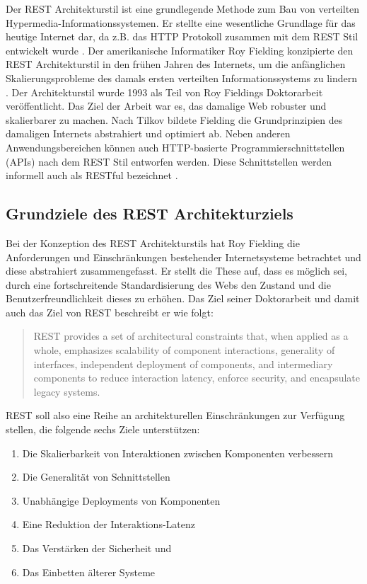 Der REST Architekturstil ist eine grundlegende Methode zum Bau von verteilten Hypermedia-Informationssystemen. Er stellte eine wesentliche Grundlage für das heutige Internet dar, da z.B. das HTTP Protokoll zusammen mit dem REST Stil entwickelt wurde . Der amerikanische Informatiker Roy Fielding konzipierte den REST Architekturstil in den frühen Jahren des Internets, um die anfänglichen Skalierungsprobleme des damals ersten verteilten Informationssystems zu lindern . Der Architekturstil wurde 1993 als Teil von Roy Fieldings Doktorarbeit veröffentlicht. Das Ziel der Arbeit war es, das damalige Web robuster und skalierbarer zu machen. Nach Tilkov bildete Fielding die Grundprinzipien des damaligen Internets abstrahiert und optimiert ab. Neben anderen Anwendungsbereichen können auch HTTP-basierte Programmierschnittstellen (APIs) nach dem REST Stil entworfen werden. Diese Schnittstellen werden informell auch als RESTful bezeichnet . 

\subsection{Grundziele des REST Architekturziels}

Bei der Konzeption des REST Architekturstils hat Roy Fielding die Anforderungen und Einschränkungen bestehender Internetsysteme betrachtet und diese abstrahiert zusammengefasst. Er stellt die These auf, dass es möglich sei, durch eine fortschreitende Standardisierung des Webs den Zustand und die Benutzerfreundlichkeit dieses zu erhöhen. Das Ziel seiner Doktorarbeit und damit auch das Ziel von REST beschreibt er wie folgt:

\begin{quote}
    REST provides a set of architectural constraints that, when applied as a whole, emphasizes scalability of component interactions, generality of interfaces, independent deployment of components, and intermediary components to reduce interaction latency, enforce security, and encapsulate legacy systems.
\end{quote}

REST soll also eine Reihe an architekturellen Einschränkungen zur Verfügung stellen, die folgende sechs Ziele unterstützen:

\begin{enumerate}
    \item Die Skalierbarkeit von Interaktionen zwischen Komponenten verbessern
    \item Die Generalität von Schnittstellen
    \item Unabhängige Deployments von Komponenten
    \item Eine Reduktion der Interaktions-Latenz
    \item Das Verstärken der Sicherheit und
    \item Das Einbetten älterer Systeme
\end{enumerate}

